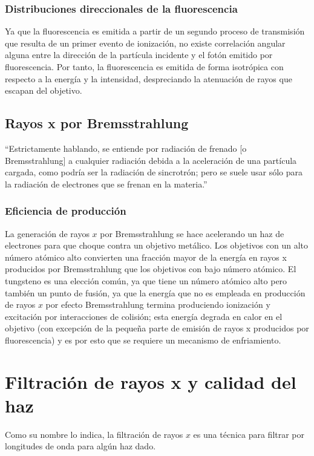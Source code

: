 \subsubsection{Distribuciones direccionales de la fluorescencia}
Ya que la fluorescencia es emitida a partir de un segundo proceso de transmisión que resulta de un primer evento de ionización, no existe correlación angular alguna entre la dirección de la partícula incidente y el fotón emitido por fluorescencia.
Por tanto, la fluorescencia es emitida de forma isotrópica con respecto a la energía y la intensidad, despreciando la atenuación de rayos que escapan del objetivo.
\linebreak
\cite{attix2008introduction}

\subsection{Rayos x por Bremsstrahlung}

``Estrictamente hablando, se entiende por radiación de frenado [o Bremsstrahlung] a cualquier radiación debida a la aceleración de una partícula cargada, como podría ser la radiación de sincrotrón; pero se suele usar sólo para la radiación de electrones que se frenan en la materia.''
\cite{Radiaci:online}


\subsubsection{Eficiencia de producción}
La generación de rayos $x$ por Bremsstrahlung se hace acelerando un haz de electrones para que choque contra un objetivo metálico. Los objetivos con un alto número atómico alto convierten una fracción mayor de la energía en rayos x producidos por Bremsstrahlung que los objetivos con bajo número atómico.
El tungsteno es una elección común, ya que tiene un número atómico alto pero también un punto de fusión, ya que la energía que no es empleada en producción de rayos $x$ por efecto Bremsstrahlung termina produciendo ionización y excitación por interacciones de colisión; esta energía degrada en calor en el objetivo (con excepción de la pequeña parte de emisión de rayos x producidos por fluorescencia) y es por esto que se requiere un mecanismo de enfriamiento.

\section{Filtración de rayos x y calidad del haz}
Como su nombre lo indica, la filtración de rayos $x$ es una técnica para filtrar por longitudes de onda para algún haz dado.

